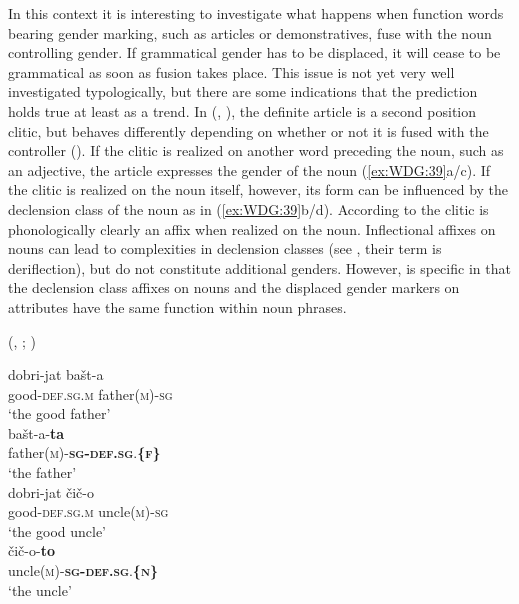 \documentclass[output=collectionpaper]{langsci/langscibook}
\begin{document}
In this context it is interesting to investigate what happens when function words bearing gender marking, such as articles or demonstratives, fuse with the noun controlling gender. If grammatical gender has to be displaced, it will cease to be grammatical as soon as fusion takes place. This issue is not yet very well investigated typologically, but there are some indications that the prediction holds true at least as a trend. In  (, ), the definite article is a second position clitic, but behaves differently depending on whether or not it is fused with the controller (\citealt[315]{Enger2012}). If the clitic is realized on another word preceding the noun, such as an adjective, the article expresses the gender of the noun (\ref{ex:WDG:39}a/c). If the clitic is realized on the noun itself, however, its form can be influenced by the declension class of the noun as in (\ref{ex:WDG:39}b/d). According to \cite[134]{Dost2006} the clitic is phonologically clearly an affix when realized on the noun. Inflectional affixes on nouns can lead to complexities in declension classes (see , their term is deriflection), but do not constitute additional genders. However,  is specific in that the declension class affixes on nouns and the displaced gender markers on attributes have the same function within noun phrases.

\largerpage
\ea\label{ex:WDG:39}
 (, ; \citealt[315]{Enger2012})\\
\begin{xlist}
\ex
\gll	dobri-jat 	bašt-a \\
	good-\textsc{def.sg.m} 	father(\textsc{m})-\textsc{sg}\\
\glt	`the good father'\\
\ex
\gll 	bašt-a-\textbf{ta}\\
	father(\textsc{m})-\textbf{\textsc{sg-def.sg}}.\textbf{\{\textsc{f}\}}\\
\glt	`the father'\\
\ex
\gll 	dobri-jat 	čič-o \\
	good-\textsc{def.sg.m} 	uncle(\textsc{m})-\textsc{sg}\\
\glt	`the good uncle'\\
\ex
\gll 	čič-o-\textbf{to}\\
	uncle(\textsc{m})-\textbf{\textsc{sg-def.sg}}.\textbf{\{\textsc{n}\}}\\
\glt	`the uncle'\\
\end{xlist}
\z
\end{document}
